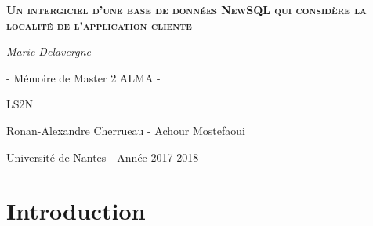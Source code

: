 \documentclass[a4paper, 10pt, titlepage]{report}
\begin{document}
%
\begin{titlepage}
	\centering
	{\scshape\LARGE\bfseries Un intergiciel d’une base de données NewSQL qui considère la localité de l’application cliente \par}
	\vspace{0cm}
	{\Large\itshape Marie Delavergne\par}
        {\Large - Mémoire de Master 2 ALMA -\par}

	\vfill

        {\Large LS2N \par}
        {\Large Ronan-Alexandre Cherrueau - Achour Mostefaoui \par}
	{\Large Université de Nantes - Année 2017-2018 \par}


\end{titlepage}


\clearpage
\tableofcontents
\newpage

\section*{Introduction}
\end{document}
